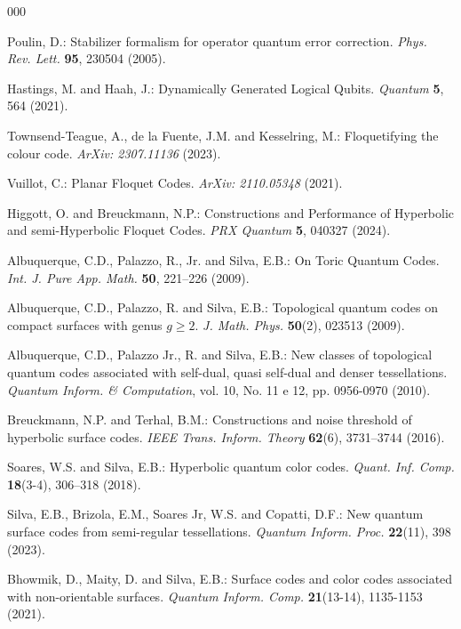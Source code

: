 \documentclass[%
reprint,
amsmath,amssymb,
aps,
]{revtex4-2}
\begin{document}
\begin{thebibliography}{000}
	
	Poulin, D.: Stabilizer formalism for operator quantum error correction. {\em Phys. Rev. Lett.} {\bf 95}, 230504 (2005).
	
	Hastings, M. and Haah, J.: Dynamically Generated Logical Qubits. {\em Quantum} {\bf 5}, 564 (2021).
	
	Townsend-Teague, A., de la Fuente, J.M. and Kesselring, M.: Floquetifying the colour code. {\em ArXiv: 2307.11136} (2023).
	
	Vuillot, C.: Planar Floquet Codes. {\em ArXiv: 2110.05348} (2021).
	
	Higgott, O. and Breuckmann, N.P.: Constructions and Performance of Hyperbolic and semi-Hyperbolic Floquet Codes. {\em PRX Quantum} {\bf 5}, 040327 (2024).
	
	Albuquerque, C.D., Palazzo, R., Jr. and Silva, E.B.: On Toric Quantum Codes. {\em Int. J. Pure App. Math.} {\bf 50}, 221--226 (2009).
	
	Albuquerque, C.D., Palazzo, R. and Silva, E.B.: Topological quantum codes on compact surfaces with genus $g\geq 2$. {\em J. Math. Phys.} {\bf 50}(2), 023513 (2009).
	
	Albuquerque, C.D., Palazzo Jr., R. and Silva, E.B.: New classes of topological quantum codes associated with self-dual, quasi self-dual and denser tessellations. {\em Quantum Inform. \& Computation}, vol. 10, No. 11 e 12, pp. 0956-0970 (2010).
	
	Breuckmann, N.P. and Terhal, B.M.: Constructions and noise threshold of hyperbolic surface codes. {\em IEEE Trans. Inform. Theory} {\bf 62}(6), 3731--3744 (2016).
	
	Soares, W.S. and Silva, E.B.: Hyperbolic quantum color codes. {\em Quant. Inf. Comp.} {\bf 18}(3-4), 306--318 (2018).
	
	Silva, E.B., Brizola, E.M., Soares Jr, W.S. and Copatti, D.F.: New quantum surface codes from semi-regular tessellations. {\em Quantum Inform. Proc.} {\bf 22}(11), 398 (2023).
	
	Bhowmik, D., Maity, D. and Silva, E.B.: Surface codes and color codes associated with non-orientable surfaces. {\em Quantum Inform. Comp.} {\bf 21}(13-14), 1135-1153 (2021).
	

\end{thebibliography}
\end{document}
